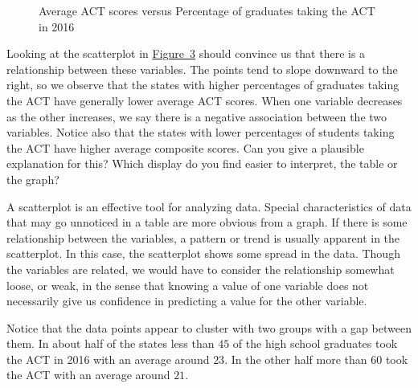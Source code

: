 \documentclass[10pt,]{book}
\theoremstyle{ptxdefinitionnotitle}
\theoremstyle{ptxdefinitiontitle}
\numberwithin{equation}{section}
\begin{document}
\begin{example}
\begin{figure}
{
}
\caption{Average ACT scores versus Percentage of graduates taking the ACT in 2016\label{scatterplot-avg-act-score}}
\end{figure}
\hypertarget{p-85}{}%
Looking at the scatterplot in \hyperref[scatterplot-avg-act-score]{Figure~3} should convince us that there is a relationship between these variables. The points tend to slope downward to the right, so we observe that the states with higher percentages of graduates taking the ACT have generally lower average ACT scores. When one variable decreases as the other increases, we say there is a negative association between the two variables. Notice also that the states with lower percentages of students taking the ACT have higher average composite scores. Can you give a plausible explanation for this? Which display do you find easier to interpret, the table or the graph? \\%
\par
\hypertarget{p-86}{}%
A scatterplot is an effective tool for analyzing data. Special characteristics of data that may go unnoticed in a table are more obvious from a graph. If there is some relationship between the variables, a pattern or trend is usually apparent in the scatterplot. In this case, the scatterplot shows some spread in the data. Though the variables are related, we would have to consider the relationship somewhat loose, or weak, in the sense that knowing a value of one variable does not necessarily give us confidence in predicting a value for the other variable. \\%
\par
\hypertarget{p-87}{}%
Notice that the data points appear to cluster with two groups with a gap between them. In about half of the states less than \(45\) of the high school graduates took the ACT in 2016 with an average around \(23\). In the other half more than \(60\) took the ACT with an average around \(21\).%
\end{example}
\end{document}
